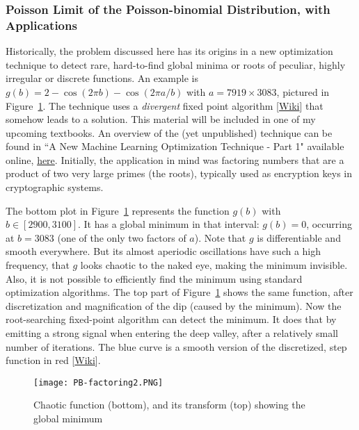 \documentclass[10pt]{article}
\begin{document}
\subsubsection{Poisson Limit of the Poisson-binomial Distribution, with Applications}\label{slogs}


Historically, the problem discussed here has its origins in a new optimization technique to detect rare, hard-to-find global minima or roots of peculiar, highly irregular or discrete functions. An example is $g(b) = 2 - \cos(2\pi b) - \cos(2\pi a/b)$ with $a = 7919 \times 3083$,  pictured in Figure~\ref{fig:pbfactor}. The technique uses a {\em divergent} 
fixed point algorithm [\href{https://en.wikipedia.org/wiki/Fixed-point_iteration}{Wiki}] 
that somehow leads to a solution. This material will be included in one of my upcoming textbooks.
An overview of the (yet unpublished) technique can be found in  ``A New Machine Learning Optimization Technique - Part 1" available online, 
\href{https://www.vgranville.com/2022/02/a-new-machine-learning-optimization.html}{here}.  Initially, the application in mind was factoring numbers that are a product of two very large primes (the roots), typically used as encryption keys in cryptographic systems. 

The bottom plot in Figure~\ref{fig:pbfactor} represents the function $g(b)$ with
$b\in [2900, 3100]$. It has a global minimum in that interval: $g(b)=0$, occurring at $b=3083$ (one of the only two factors of $a$). Note that $g$ is differentiable and smooth everywhere. But its almost aperiodic oscillations have such a high frequency, that $g$ looks chaotic to the naked eye, making the minimum invisible. Also, it is not possible to efficiently find the minimum using standard optimization algorithms. The top part of Figure~\ref{fig:pbfactor} shows the same function, after discretization and magnification of the dip (caused by the minimum). Now the root-searching fixed-point algorithm can detect the minimum. It does that by emitting a strong signal when entering the deep valley, after a relatively small number of iterations. The blue curve is a smooth version of the discretized,  step function in red [\href{https://en.wikipedia.org/wiki/Step_function}{Wiki}].


\begin{figure}%
\centering
\texttt{[image: PB-factoring2.PNG]}
\caption{Chaotic function (bottom), and its transform (top) showing the global minimum}
\label{fig:pbfactor}
\end{figure}
\end{document}
